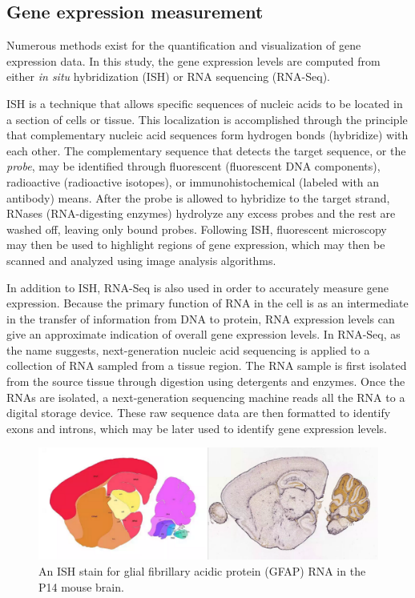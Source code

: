 \documentclass[12pt,oneside,onecolumn,a4paper]{article}
\begin{document}
\subsection{Gene expression measurement}
Numerous methods exist for the quantification and visualization of gene expression data. In this study, the gene expression levels are computed from either \textit{in situ} hybridization (ISH) or RNA sequencing (RNA-Seq). 

ISH is a technique that allows specific sequences of nucleic acids to be located in a section of cells or tissue. This localization is accomplished through the principle that complementary nucleic acid sequences form hydrogen bonds (hybridize) with each other. The complementary sequence that detects the target sequence, or the \textit{probe}, may be identified through fluorescent (fluorescent DNA components), radioactive (radioactive isotopes), or immunohistochemical (labeled with an antibody) means. After the probe is allowed to hybridize to the target strand, RNases (RNA-digesting enzymes) hydrolyze any excess probes and the rest are washed off, leaving only bound probes. Following ISH, fluorescent microscopy may then be used to highlight regions of gene expression, which may then be scanned and analyzed using image analysis algorithms. \citep{Angerer_1991}

In addition to ISH, RNA-Seq is also used in order to accurately measure gene expression. Because the primary function of RNA in the cell is as an intermediate in the transfer of information from DNA to protein, RNA expression levels can give an approximate indication of overall gene expression levels. In RNA-Seq, as the name suggests, next-generation nucleic acid sequencing is applied to a collection of RNA sampled from a tissue region. The RNA sample is first isolated from the source tissue through digestion using detergents and enzymes. Once the RNAs are isolated, a next-generation sequencing machine reads all the RNA to a digital storage device. These raw sequence data are then formatted to identify exons and introns, which may be later used to identify gene expression levels. 
\citep{Wang_2009}


\begin{figure}[h!]
\begin{center}
\includegraphics[width=0.7\columnwidth]{figures/ISH/ISH}
\caption{An ISH stain for glial fibrillary acidic protein (GFAP) RNA in the P14 mouse brain.%
}
\end{center}
\end{figure}
\end{document}
